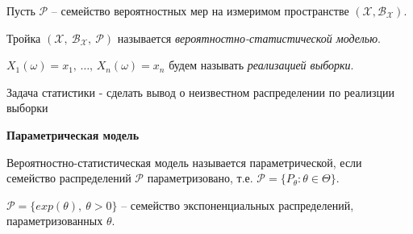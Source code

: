 Пусть $\displaystyle \mathcal{P}$ -- семейство вероятностных мер на измеримом пространстве $\displaystyle (\mathcal{X} ,\mathcal{B}_{\mathcal{X}})$.
\begin{definition}
	Тройка $\displaystyle (\mathcal{X},\ \mathcal{B}_{\mathcal{X}},\ \mathcal{P})$ называется \textit{вероятностно-статистической моделью}.
\end{definition}
\begin{definition}
	$\displaystyle X_{1}( \omega ) =x_{1},\,\ldots,\, X_{n}(\omega) = x_{n}$ будем называть\textit{ реализацией выборки}.
\end{definition}
\begin{note}
Задача статистики - сделать вывод о неизвестном распределении по реализции выборки 
\end{note}
\textbf{Параметрическая модель}
\begin{definition}
Вероятностно-статистическая модель называется параметрической, если семейство распределений $\displaystyle \mathcal{P}$ параметризовано, т.е. $\displaystyle \mathcal{P} =\{P_{\theta } :\theta \in \Theta \}$.
\end{definition}
\begin{example}
$\displaystyle \mathcal{P} =\{exp( \theta ),\ \theta  >0\}$ -- семейство экспоненциальных распределений, параметризованных $\displaystyle \theta $.
\end{example}